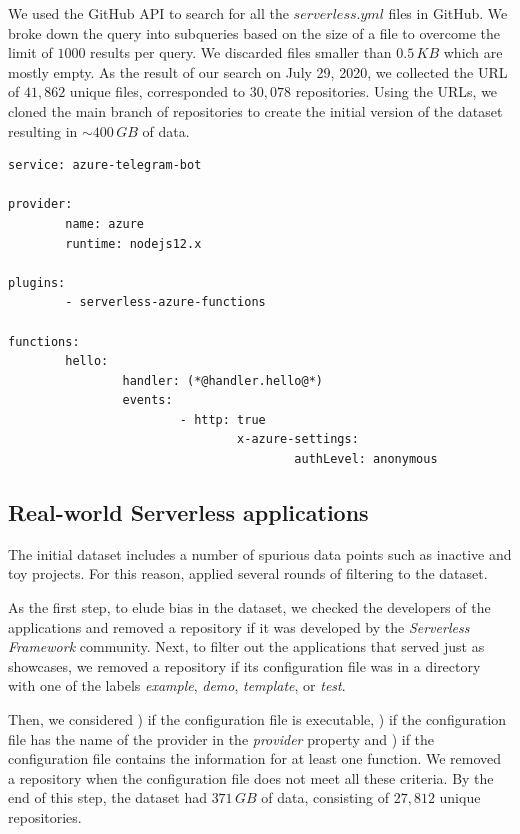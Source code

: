 We used the GitHub API to search for all the $serverless.yml$ files in GitHub. 
We broke down the query into subqueries based on the size of a file to 
overcome the limit of $1000$ results per query.
We discarded files smaller than $0.5\,KB$ which are mostly empty.
As the result of our search on July 29, 2020, 
we collected the URL of $41,862$ unique files, corresponded to 
$30,078$ repositories. Using the URLs, we cloned the main branch 
of repositories to create the initial version of the dataset resulting 
in $\sim400 \, GB$ of data.

\vspace{2mm}

\begin{lstlisting}[frame=single, caption=An example of a serverless.yml configuration file., label={lst:example}, captionpos=b]
service: azure-telegram-bot 

provider:  
		name: azure
		runtime: nodejs12.x  

plugins:  
		- serverless-azure-functions 

functions:
		hello:    
				handler: (*@handler.hello@*)
				events:   
						- http: true        
								x-azure-settings:          
										authLevel: anonymous
\end{lstlisting}

\subsection{Real-world Serverless applications} \label{phaseB}
The initial dataset includes a number of spurious data points 
such as inactive and toy projects. For this reason, applied several rounds 
of filtering to the dataset.

As the first step, to elude bias in the dataset, we checked the developers 
of the applications and removed a repository if it was developed 
by the \emph{Serverless Framework} community. 
Next, to filter out the applications 
that served just as showcases, we removed a repository if its configuration file 
was in a directory with one of the labels 
\emph{example}, \emph{demo}, \emph{template}, or \emph{test}.

Then, 
we considered ) if the configuration file is executable, ) if 
the configuration file has the name of the provider in the 
\emph{provider} property and 
) if the configuration file contains the information for at least one 
function. We removed a repository when the configuration file
does not meet all these criteria. 
%
By the end of this step, the dataset had $371 \, GB$ of data, consisting 
of $27,812$ unique repositories. 

